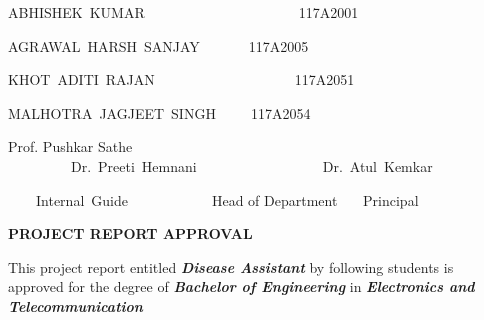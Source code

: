 \documentclass[12pt]{article}
\begin{document}
\vspace{\baselineskip}
\begin{Center}
{\fontsize{14pt}{16.8pt}\selectfont ABHISHEK\ KUMAR\ \ \ \ \ \ \ \ \ \ \ \ \ \ \ \ \ \ \ \ \ \   117A2001}
\end{Center}
\begin{Center}
{\fontsize{14pt}{16.8pt}\selectfont AGRAWAL\ HARSH\ SANJAY\ \ \ \ \ \ \    117A2005}
\end{Center}
\begin{Center}
{\fontsize{14pt}{16.8pt}\selectfont KHOT\ ADITI\ RAJAN\ \ \ \ \ \ \ \ \ \ \ \ \ \ \ \ \ \ \ \    117A2051}
\end{Center}
\begin{Center}
{\fontsize{14pt}{16.8pt}\selectfont MALHOTRA\ JAGJEET\ SINGH\ \ \ \ \    117A2054}
\end{Center}

\vspace{\baselineskip}

\vspace{\baselineskip}

\vspace{\baselineskip}

\begin{justify}
{\fontsize{14pt}{16.8pt}\selectfont Prof. Pushkar Sathe \tab \ \ \ \ \ \ \ \ \ Dr.\ Preeti\ Hemnani\ \ \ \ \ \ \ \ \ \ \ \ \ \ \ \ \ \ Dr.\ Atul\ Kemkar\ \ \ \ \ \ \ \ \ \ \        \par}
\end{justify}
\begin{justify}
{\fontsize{14pt}{16.8pt}\selectfont \ \ \ \ Internal\ Guide\ \ \ \    \tab \ \ \ \ \ \ \ \  Head of Department \tab \tab \ \ \  Principal}
\end{justify}
\begin{Center}

\vspace{\baselineskip}
\vspace{\baselineskip}
\vspace{\baselineskip}

\textbf{PROJECT REPORT APPROVAL}
\end{Center}

\vspace{\baselineskip}
This project report entitled \textbf{\textit{Disease Assistant}} by following students is approved for the degree of \textbf{\textit{Bachelor of Engineering}} in \textbf{\textit{Electronics and Telecommunication }}
\end{document}
